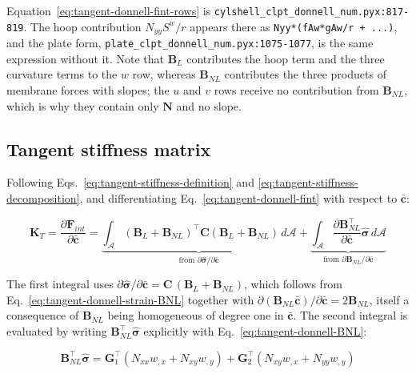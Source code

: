 Equation~\ref{eq:tangent-donnell-fint-rows} is \texttt{cylshell\_clpt\_donnell\_num.pyx:817-819}. The hoop contribution $N_{yy} S^w / r$ appears there as \texttt{Nyy*(fAw*gAw/r + ...)}, and the plate form, \texttt{plate\_clpt\_donnell\_num.pyx:1075-1077}, is the same expression without it. Note that $\boldsymbol{B}_L$ contributes the hoop term and the three curvature terms to the $w$ row, whereas $\boldsymbol{B}_{NL}$ contributes the three products of membrane forces with slopes; the $u$ and $v$ rows receive no contribution from $\boldsymbol{B}_{NL}$, which is why they contain only $\boldsymbol{N}$ and no slope.

\subsection{Tangent stiffness matrix}

Following Eqs.~\ref{eq:tangent-stiffness-definition} and \ref{eq:tangent-stiffness-decomposition}, and differentiating Eq.~\ref{eq:tangent-donnell-fint} with respect to $\bar{\boldsymbol{c}}$:

\begin{equation}\label{eq:tangent-donnell-KT}
	\boldsymbol{K}_T = \frac{\partial \boldsymbol{F}_{int}}{\partial \bar{\boldsymbol{c}}}
	= \underbrace{\int_{\mathcal{A}} (\boldsymbol{B}_L + \boldsymbol{B}_{NL})^\top \boldsymbol{C} (\boldsymbol{B}_L + \boldsymbol{B}_{NL}) \, d\mathcal{A}}_{\text{from } \partial \hat{\boldsymbol{\sigma}} / \partial \bar{\boldsymbol{c}}}
	+ \underbrace{\int_{\mathcal{A}} \frac{\partial \boldsymbol{B}_{NL}^\top}{\partial \bar{\boldsymbol{c}}} \hat{\boldsymbol{\sigma}} \, d\mathcal{A}}_{\text{from } \partial \boldsymbol{B}_{NL} / \partial \bar{\boldsymbol{c}}}
\end{equation}

The first integral uses $\partial \hat{\boldsymbol{\sigma}} / \partial \bar{\boldsymbol{c}} = \boldsymbol{C}\,(\boldsymbol{B}_L + \boldsymbol{B}_{NL})$, which follows from Eq.~\ref{eq:tangent-donnell-strain-BNL} together with $\partial (\boldsymbol{B}_{NL}\bar{\boldsymbol{c}}) / \partial \bar{\boldsymbol{c}} = 2\boldsymbol{B}_{NL}$, itself a consequence of $\boldsymbol{B}_{NL}$ being homogeneous of degree one in $\bar{\boldsymbol{c}}$. The second integral is evaluated by writing $\boldsymbol{B}_{NL}^\top \hat{\boldsymbol{\sigma}}$ explicitly with Eq.~\ref{eq:tangent-donnell-BNL}:

\begin{equation*}
	\boldsymbol{B}_{NL}^\top \hat{\boldsymbol{\sigma}} = \boldsymbol{G}_1^\top \left( N_{xx} w_{,x} + N_{xy} w_{,y} \right) + \boldsymbol{G}_2^\top \left( N_{xy} w_{,x} + N_{yy} w_{,y} \right)
\end{equation*}

